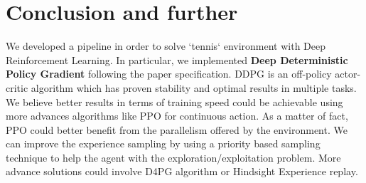\documentclass[11pt]{article}
\begin{document}
\section{Conclusion and further}
\label{sec:org344ed33}
We developed a pipeline in order to solve `tennis` environment with Deep
Reinforcement Learning. In particular, we implemented \textbf{Deep Deterministic Policy
Gradient} following the paper specification. DDPG is an off-policy actor-critic
algorithm which has proven stability and optimal results in multiple tasks. We
believe better results in terms of training speed could be achievable using more
advances algorithms like PPO for continuous action. As a matter of fact, PPO
could better benefit from the parallelism offered by the environment. We can
improve the experience sampling by using a priority based sampling technique to
help the agent with the exploration/exploitation problem. More advance solutions
could involve D4PG algorithm or Hindsight Experience replay. 
\end{document}

